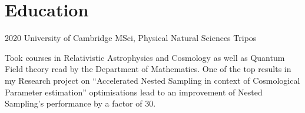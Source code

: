 \documentclass{CurriculumVitae}[10pt, condensed]
\begin{document}
{\begin{comment}
  \job{Jan 2013}{May 2015}  {Masterlagebra.org} {Backend Developer}
  {Designed and implemented problems for university level automated
    linear algebra training program. Problems were related to complex
    numbers, Gram-Schmidt ortho-normalisation process, analytical geometry
    problems involving planes and lines in higher dimensions.
  }
\end{comment}

\begin{comment}
  \section*{Volunteer work} \job{2015}{2017}{Queens' College}
  {Technical director} {I supervised a self-motivated team of
    volunteers to set up and dismantle decorations at the Queens'
    College Fitzpatrick Hall, as well as handle Audio visual equiment
    including but not limited to ROBE colorspots, human sized
    speakers, trusses, stage hydraulics, a laser projector and
    multiple smoke machines.  During QErgs 2016 (which is the largest
    indoors rowing competition in the world), we had a large
    issue. The Ergs (devices which measured the sportspeople's
    performance) were located at the far side of the hall, right under
    the projector screen and opposite the projector. They had to be
    connected to the projector via a CAT6 shielded wire. As it turned
    out, the shielded wire didn't have enough range, and the race
    would have been called off.  I quickly made a skype call with
    desktop sharing to the Wi-Fi connected laptop at the far side. }
\end{comment}

\section*{Education}%

%
          {2020}%
          {University of Cambridge}%
          {MSci, }
          {Physical Natural Sciences Tripos}%
          {%

            Took courses in Relativistic Astrophysics and Cosmology as
            well as Quantum Field theory read by the Department of
            Mathematics. One of the top results in my Research project
            on ``Accelerated Nested Sampling in context of
            Cosmological Parameter estimation''%
            optimisations lead to an improvement of Nested Sampling's
            performance by a factor of 30.
          }%


}
\end{document}
